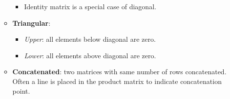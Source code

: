 \documentclass[12pt,a4paper]{article}
\begin{document}
\begin{itemize}
\begin{itemize}
                \begin{itemize}
                    \item Identity matrix is a special case of diagonal.
                \end{itemize}
            \item \textbf{Triangular}:
                \begin{itemize}
                    \item \textit{Upper}: all elements {\color{o-Sun}below} diagonal are zero.
                    \item \textit{Lower}: all elements {\color{o-Sun}above} diagonal are zero.
                \end{itemize}
            \item \textbf{Concatenated}: two matrices with same number of rows concatenated. Often a line is placed in the product matrix to indicate concatenation point.
        \end{itemize}
\end{itemize}
\end{document}
